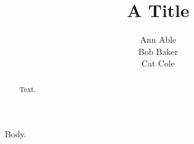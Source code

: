 \documentclass{llncs}
\begin{document}
\title{A Title}
\author{Ann Able \\
Bob Baker \\
Cat Cole}
\maketitle
\begin{abstract}Text.\end{abstract}
Body.
\end{document}
